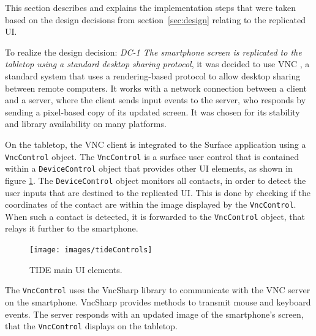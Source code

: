 
This section describes and explains the implementation steps that were taken based on the design decisions from section~\ref{sec:design} relating to the replicated UI.

To realize the design decision: 
\emph{DC-1 The smartphone screen is replicated to the tabletop using a standard desktop sharing protocol}, 
it was decided to use VNC \citep{Richardson:1998:vnc}, a standard system that uses a rendering-based protocol to allow desktop sharing between remote computers.
It works with a network connection between a client and a server, where the client sends input events to the server, who responds by sending a pixel-based copy of its updated screen.
It was chosen for its stability and library availability on many platforms.


On the tabletop, the VNC client is integrated to the Surface application using a \texttt{VncControl} object.
The \texttt{VncControl} is a surface user control that is contained within a \texttt{DeviceControl} object that provides other UI elements, as shown in figure \ref{fig:tideControls}.
The \texttt{DeviceControl} object monitors all contacts, in order to detect the user inputs that are destined to the replicated UI.
This is done by checking if the coordinates of the contact are within the image displayed by the \texttt{VncControl}.
When such a contact is detected, it is forwarded to the \texttt{VncControl} object, that relays it further to the smartphone.

\begin{figure}[htb]
  \centering
    \texttt{[image: images/tideControls]}
    \caption{TIDE main UI elements.}
    \label{fig:tideControls}
\end{figure}

The \texttt{VncControl} uses the VncSharp library to communicate with the VNC server on the smartphone.
VncSharp provides methods to transmit mouse and keyboard events.
The server responds with an updated image of the smartphone's screen, that the \texttt{VncControl} displays on the tabletop.

